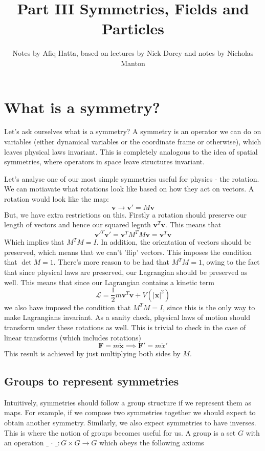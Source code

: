\documentclass[11pt, oneside]{article}   	%
\title{Part III Symmetries, Fields and Particles}
\author{Notes by Afiq Hatta, based on lectures by Nick Dorey and notes by Nicholas Manton}
\theoremstyle{slanted}
\begin{document}
\maketitle
\tableofcontents

\pagebreak 

\section{What is a symmetry?}
Let's ask ourselves what is a symmetry? A symmetry is an operator we can do on variables (either dynamical variables or the coordinate frame or otherwise), which leaves physical laws invariant. This is completely analogous to the idea of spatial symmetries, where operators in space leave structures invariant. 

Let's analyse one of our most simple symmetries useful for physics - the rotation. We can motiavate what rotations look like based on how they act on vectors. A rotation would look like the map: 
\[ 
	\mathbf{v} \rightarrow \mathbf{v}' =  M \mathbf{v} 
\] 
But, we have extra restrictions on this. Firstly a rotation should preserve our length of vectors and hence our squared legnth $\mathbf{v}^T \mathbf{v} $. This means that 
\[ 
	\mathbf{v}'^T \mathbf{v}' = \mathbf{v}^T  M^T M \mathbf{v}  = \mathbf{v}^T \mathbf{v} 
\]
Which implies that $M^T M = I$. In addition, the orientation of vectors should be preserved, which means that we can't 'flip' vectors. This imposes the condition that $\det M = 1$.  
There's more reason to be had that $M^T M  =1$, owing to the fact that since physical laws are preserved, our Lagrangian should be preserved as well. 
This means that since our Lagrangian contains a kinetic term
\[ 
	\mathcal{L }  = \frac{1}{ 2} m \mathbf{v}^T \mathbf{v} + V( |\mathbf{x}|^2 ) \] 
we also have imposed the condition that $M^T M = I$, since this is the only way to make Lagrangians invariant. As a sanity check, physical laws of motion should transform under these rotations as well. This is trivial to check in the case of linear transforms (which includes rotations)
\[ 
	\mathbf{F}  = m \ddot{ \mathbf{x} } \implies \mathbf{F}' = m \ddot{x}  ' 
\]  
This result is achieved by just multiplying both sides by $M$. 

\subsection{Groups to represent symmetries}
Intuitively, symmetries should follow a group structure if we represent them as maps. For example, if we compose two symmetries together we should expect to obtain another symmetry. Similarly, we also expect symmetries to have inverses. This is where the notion of groups becomes useful for us. A group is a set $G$ with an operation $\_ \,  \cdot \,  \_ : G \times G  \rightarrow G $ which obeys the following axioms
\end{document}
